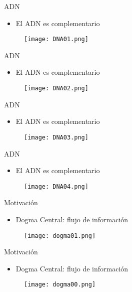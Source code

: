 \documentclass{beamer}
\begin{document}
\begin{frame}{ADN}
\begin{itemize}
\item El ADN es complementario
\end{itemize}
\begin{figure}
\centering
\texttt{[image: DNA01.png]}
\end{figure}
\end{frame}

\begin{frame}{ADN}
\begin{itemize}
\item El ADN es complementario
\end{itemize}
\begin{figure}
\centering
\texttt{[image: DNA02.png]}
\end{figure}
\end{frame}

\begin{frame}{ADN}
\begin{itemize}
\item El ADN es complementario
\end{itemize}
\begin{figure}
\centering
\texttt{[image: DNA03.png]}
\end{figure}
\end{frame}


\begin{frame}{ADN}
\begin{itemize}
\item El ADN es complementario
\end{itemize}
\begin{figure}
\centering
\texttt{[image: DNA04.png]}
\end{figure}
\end{frame}


\begin{frame}{Motivación}
\begin{itemize}
\item Dogma Central: flujo de información
\end{itemize}
\begin{figure}[H]
\centering
\texttt{[image: dogma01.png]}
\end{figure}
\end{frame}

\begin{frame}{Motivación}
\begin{itemize}
\item Dogma Central: flujo de información
\end{itemize}
\begin{figure}[H]
\centering
\texttt{[image: dogma00.png]}
\end{figure}
\end{frame}
\end{document}
